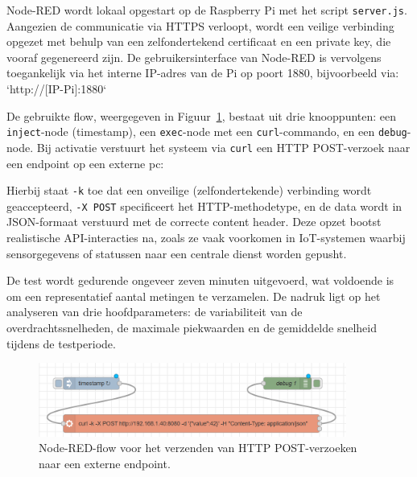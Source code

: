 Node-RED wordt lokaal opgestart op de Raspberry Pi met het script \texttt{server.js}. Aangezien de communicatie via HTTPS verloopt, wordt een veilige verbinding opgezet met behulp van een zelfondertekend certificaat en een private key, die vooraf gegenereerd zijn. De gebruikersinterface van Node-RED is vervolgens toegankelijk via het interne IP-adres van de Pi op poort 1880, bijvoorbeeld via: `http://[IP-Pi]:1880`



De gebruikte flow, weergegeven in Figuur~\ref{fig:nodered-flow}, bestaat uit drie knooppunten: een \texttt{inject}-node (timestamp), een \texttt{exec}-node met een \texttt{curl}-commando, en een \texttt{debug}-node. Bij activatie verstuurt het systeem via \texttt{curl} een HTTP POST-verzoek naar een endpoint op een externe pc:


Hierbij staat \texttt{-k} toe dat een onveilige (zelfondertekende) verbinding wordt geaccepteerd, \texttt{-X POST} specificeert het HTTP-methodetype, en de data wordt in JSON-formaat verstuurd met de correcte content header. Deze opzet bootst realistische API-interacties na, zoals ze vaak voorkomen in IoT-systemen waarbij sensorgegevens of statussen naar een centrale dienst worden gepusht.

De test wordt gedurende ongeveer zeven minuten uitgevoerd, wat voldoende is om een representatief aantal metingen te verzamelen. De nadruk ligt op het analyseren van drie hoofdparameters: de variabiliteit van de overdrachtssnelheden, de maximale piekwaarden en de gemiddelde snelheid tijdens de testperiode. 

\begin{figure}[h]
    \centering
    \includegraphics[width=0.9\textwidth]{../graphics/node-red_flow.png}
    \caption{Node-RED-flow voor het verzenden van HTTP POST-verzoeken naar een externe endpoint.}
    \label{fig:nodered-flow}
\end{figure}

